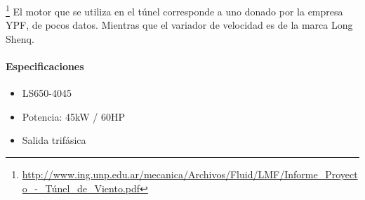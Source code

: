 	\footnote{\url{http://www.ing.unp.edu.ar/mecanica/Archivos/Fluid/LMF/Informe_Proyecto_-_Túnel_de_Viento.pdf}}
El motor que se utiliza en el túnel corresponde a uno donado por la empresa YPF, de pocos datos. Mientras que el variador de velocidad es de la marca Long Shenq.

\paragraph*{Especificaciones}
	\begin{minipage}[t]{.7\textwidth}
		\begin{itemize}
			\item LS650-4045
			\item Potencia: 45kW / 60HP
			\item Salida trifásica
		\end{itemize}
	\end{minipage}	
	\begin{minipage}[t]{.3\textwidth}
		\centering{}
		\label{fig:LS650}
	\end{minipage}

		
		\newpage
